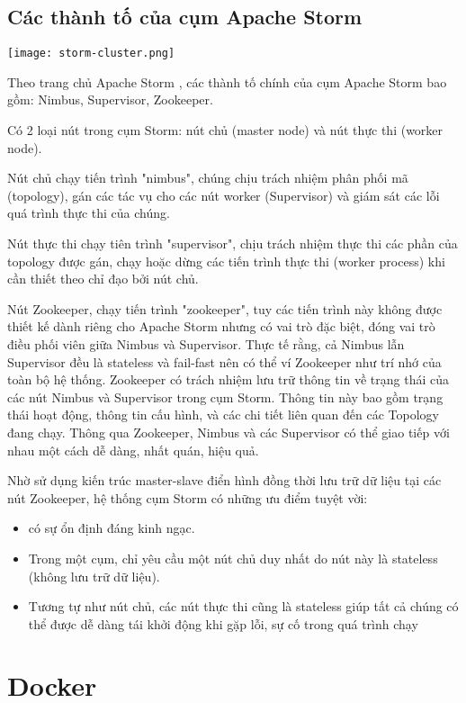 \subsection{Các thành tố của cụm Apache Storm}

\texttt{[image: storm-cluster.png]}

Theo trang chủ Apache Storm \autocite{apachestorm}, các thành tố chính của cụm Apache Storm bao gồm: Nimbus, Supervisor, Zookeeper.

Có 2 loại nút trong cụm Storm: nút chủ (master node) và nút thực thi (worker node).

Nút chủ chạy tiến trình "nimbus", chúng chịu trách nhiệm phân phối mã (topology), gán các tác vụ cho các nút worker (Supervisor) và giám sát các lỗi quá trình thực thi của chúng.

Nút thực thi chạy tiên trình "supervisor", chịu trách nhiệm thực thi các phần của topology được gán, chạy hoặc dừng các tiến trình thực thi (worker process) khi cần thiết theo chỉ đạo bởi nút chủ.

Nút Zookeeper, chạy tiến trình "zookeeper", tuy các tiến trình này không được thiết kế dành riêng cho Apache Storm nhưng có vai trò đặc biệt, đóng vai trò điều phối viên giữa Nimbus và Supervisor. Thực tế rằng, cả Nimbus lẫn Supervisor đều là stateless và fail-fast nên có thể ví Zookeeper như trí nhớ của toàn bộ hệ thống. Zookeeper có trách nhiệm lưu trữ thông tin về trạng thái của các nút Nimbus và Supervisor trong cụm Storm. Thông tin này bao gồm trạng thái hoạt động, thông tin cấu hình, và các chi tiết liên quan đến các Topology đang chạy. Thông qua Zookeeper, Nimbus và các Supervisor có thể giao tiếp với nhau một cách dễ dàng, nhất quán, hiệu quả.

Nhờ sử dụng kiến trúc master-slave điển hình đồng thời lưu trữ dữ liệu tại các nút Zookeeper, hệ thống cụm Storm có những ưu điểm tuyệt vời:
\begin{itemize}
    \item có sự ổn định đáng kinh ngạc.
    \item Trong một cụm, chỉ yêu cầu một nút chủ duy nhất do nút này là stateless (không lưu trữ dữ liệu).
    \item Tương tự như nút chủ, các nút thực thi cũng là stateless giúp tất cả chúng có thể được dễ dàng tái khởi động khi gặp lỗi, sự cố trong quá trình chạy
\end{itemize}

\section{Docker}

